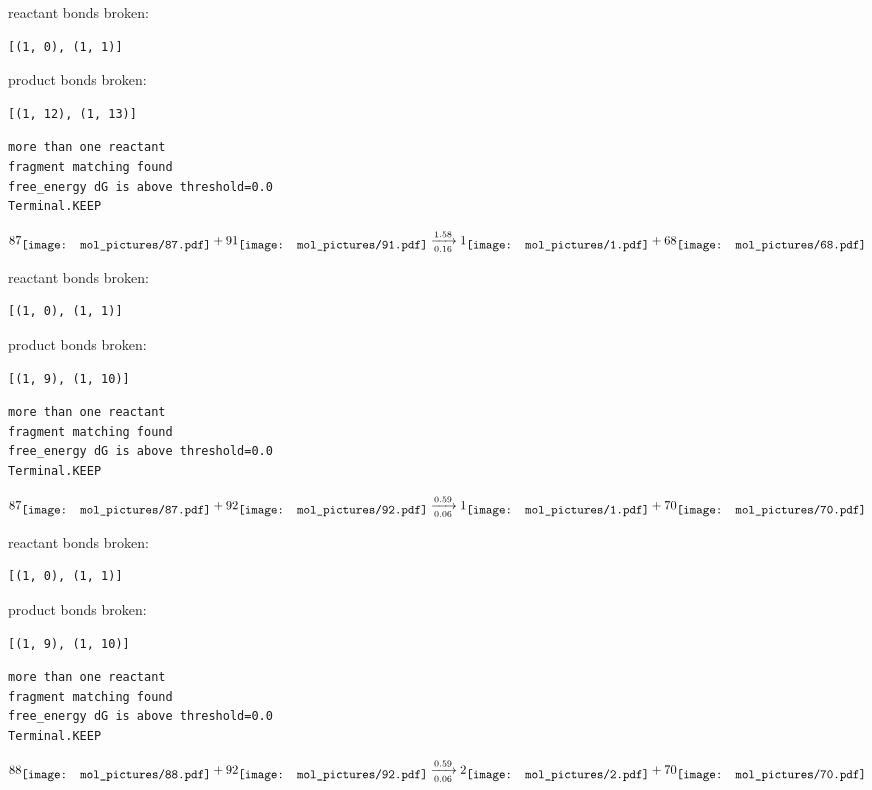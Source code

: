 \documentclass{article}
\begin{document}
reactant bonds broken:\begin{verbatim}
[(1, 0), (1, 1)]
\end{verbatim}
product bonds broken:\begin{verbatim}
[(1, 12), (1, 13)]
\end{verbatim}




\vspace{1cm}
\begin{verbatim}
more than one reactant
fragment matching found
free_energy dG is above threshold=0.0
Terminal.KEEP
\end{verbatim}
$$
87
\raisebox{-.5\height}{\texttt{[image: mol\_pictures/87.pdf]}}
+
91
\raisebox{-.5\height}{\texttt{[image: mol\_pictures/91.pdf]}}
\xrightarrow[0.16]{1.58}
1
\raisebox{-.5\height}{\texttt{[image: mol\_pictures/1.pdf]}}
+
68
\raisebox{-.5\height}{\texttt{[image: mol\_pictures/68.pdf]}}
$$


reactant bonds broken:\begin{verbatim}
[(1, 0), (1, 1)]
\end{verbatim}
product bonds broken:\begin{verbatim}
[(1, 9), (1, 10)]
\end{verbatim}




\vspace{1cm}
\begin{verbatim}
more than one reactant
fragment matching found
free_energy dG is above threshold=0.0
Terminal.KEEP
\end{verbatim}
$$
87
\raisebox{-.5\height}{\texttt{[image: mol\_pictures/87.pdf]}}
+
92
\raisebox{-.5\height}{\texttt{[image: mol\_pictures/92.pdf]}}
\xrightarrow[0.06]{0.59}
1
\raisebox{-.5\height}{\texttt{[image: mol\_pictures/1.pdf]}}
+
70
\raisebox{-.5\height}{\texttt{[image: mol\_pictures/70.pdf]}}
$$


reactant bonds broken:\begin{verbatim}
[(1, 0), (1, 1)]
\end{verbatim}
product bonds broken:\begin{verbatim}
[(1, 9), (1, 10)]
\end{verbatim}




\vspace{1cm}
\begin{verbatim}
more than one reactant
fragment matching found
free_energy dG is above threshold=0.0
Terminal.KEEP
\end{verbatim}
$$
88
\raisebox{-.5\height}{\texttt{[image: mol\_pictures/88.pdf]}}
+
92
\raisebox{-.5\height}{\texttt{[image: mol\_pictures/92.pdf]}}
\xrightarrow[0.06]{0.59}
2
\raisebox{-.5\height}{\texttt{[image: mol\_pictures/2.pdf]}}
+
70
\raisebox{-.5\height}{\texttt{[image: mol\_pictures/70.pdf]}}
$$
\end{document}
